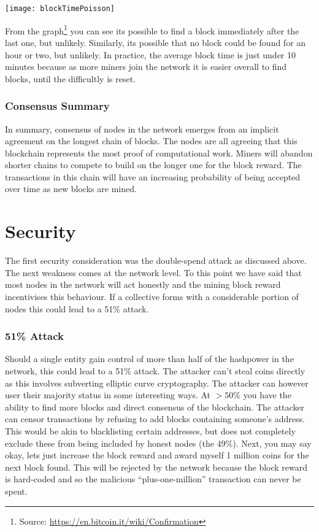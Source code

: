 \begin{center}
	\texttt{[image: blockTimePoisson]}
\end{center}

From the graph\footnote{Source: \url{https://en.bitcoin.it/wiki/Confirmation}} you can see its possible to find a block immediately after the last one, but unlikely. Similarly, its possible that no block could be found for an hour or two, but unlikely. In practice, the average block time is just under 10 minutes because as more miners join the network it is easier overall to find blocks, until the difficultly is reset. 

\subsubsection*{Consensus Summary}
In summary, consensus of nodes in the network emerges from an implicit agreement on the longest chain of blocks. The nodes are all agreeing that this blockchain represents the most proof of computational work. Miners will abandon shorter chains to compete to build on the longer one for the block reward. The transactions in this chain will have an increasing probability of being accepted over time as new blocks are mined.

\section{Security}\label{Se:BCSecurity}
The first security consideration was the double-spend attack as discussed above. The next weakness comes at the network level. To this point we have said that most nodes in the network will act honestly and the mining block reward incentivises this behaviour. If a collective forms with a considerable portion of nodes this could lead to a 51\% attack.

\subsubsection*{51\% Attack}\label{Se:51}
Should a single entity gain control of more than half of the hashpower in the network, this could lead to a 51\% attack. The attacker can't steal coins directly as this involves subverting elliptic curve cryptography. The attacker can however user their majority status in some interesting ways. At $>50\%$ you have the ability to find more blocks and direct consensus of the blockchain. The attacker can censor transactions by refusing to add blocks containing someone's address. This would be akin to blacklisting certain addresses, but does not completely exclude these from being included by honest nodes (the 49\%). Next, you may say okay, lets just increase the block reward and award myself 1 million coins for the next block found. This will be rejected by the network because the block reward is hard-coded and so the malicious ``plus-one-million'' transaction can never be spent. 

